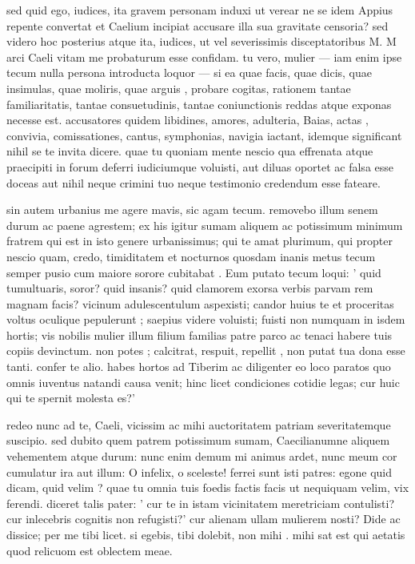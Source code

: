  sed quid ego, iudices, ita gravem personam induxi ut verear ne se idem Appius repente convertat et Caelium incipiat accusare illa sua gravitate censoria? sed videro hoc posterius atque ita, iudices, ut vel severissimis disceptatoribus M. M arci Caeli vitam me probaturum esse confidam. tu vero, mulier — iam enim ipse tecum nulla persona introducta loquor — si ea quae facis, quae dicis, quae insimulas, quae moliris, quae arguis , probare cogitas, rationem tantae familiaritatis, tantae consuetudinis, tantae coniunctionis reddas atque exponas necesse est. accusatores quidem libidines, amores, adulteria, Baias, actas , convivia, comissationes, cantus, symphonias, navigia iactant, idemque significant nihil se te invita dicere. quae tu quoniam mente nescio qua effrenata atque praecipiti in forum deferri iudiciumque voluisti, aut diluas oportet ac falsa esse doceas aut nihil neque crimini tuo neque testimonio credendum esse fateare.

 sin autem urbanius me agere mavis, sic agam tecum. removebo illum senem durum ac paene agrestem; ex his igitur sumam aliquem ac potissimum minimum fratrem qui est in isto genere urbanissimus; qui te amat plurimum, qui propter nescio quam, credo, timiditatem et nocturnos quosdam inanis metus tecum semper pusio cum maiore sorore cubitabat . Eum putato tecum loqui: ' quid tumultuaris, soror? quid insanis? quid clamorem exorsa verbis parvam rem magnam facis? vicinum adulescentulum aspexisti; candor huius te et proceritas voltus oculique pepulerunt ; saepius videre voluisti; fuisti non numquam in isdem hortis; vis nobilis mulier illum filium familias patre parco ac tenaci habere tuis copiis devinctum. non potes ; calcitrat, respuit, repellit , non putat tua dona esse tanti. confer te alio. habes hortos ad Tiberim ac diligenter eo loco paratos quo omnis iuventus natandi causa venit; hinc licet condiciones cotidie legas; cur huic qui te spernit molesta es?'

 redeo nunc ad te, Caeli, vicissim ac mihi auctoritatem patriam severitatemque suscipio. sed dubito quem patrem potissimum sumam, Caecilianumne aliquem vehementem atque durum: nunc enim demum mi animus ardet, nunc meum cor cumulatur ira aut illum: O infelix, o sceleste! ferrei sunt isti patres: egone quid dicam, quid velim ? quae tu omnia tuis foedis factis facis ut nequiquam velim, vix ferendi. diceret talis pater: ' cur te in istam vicinitatem meretriciam contulisti? cur inlecebris cognitis non refugisti?' cur alienam ullam mulierem nosti? Dide ac dissice; per me tibi licet. si egebis, tibi dolebit, non mihi . mihi sat est qui aetatis quod relicuom est oblectem meae.


